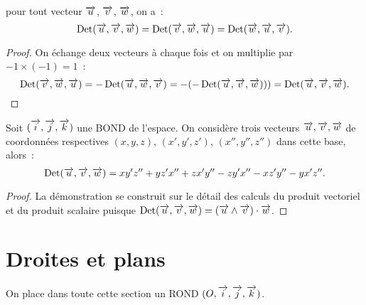 \begin{cor}
  pour tout vecteur \(\vu\), \(\vv\), \(\vw\), on a~:
  \begin{equation}
    \Det(\vu, \vv, \vw) = \Det(\vv, \vw, \vu) = \Det(\vw, \vu, \vv).
  \end{equation}
\end{cor}

\begin{proof}
  On échange deux vecteurs à chaque fois et on multiplie par \(-1\times(-1) =
  1\)~:
  \begin{equation}
    \Det(\vv, \vw, \vu) = -\Det(\vu, \vw, \vv) = -(-\Det(\vu, \vv, \vw))) =
    \Det(\vu, \vv, \vw).
  \end{equation}
\end{proof}

\begin{prop}
  Soit \(\bondtrois\) une BOND de l'espace. On considère trois vecteurs \(\vu,
  \vv, \vw\) de coordonnées respectives \((x, y, z)\), \((x', y', z')\),
  \((x'', y'', z'')\) dans cette base, alors~:
  \begin{equation}
    \Det(\vu, \vv, \vw) = xy'z'' + yz'x'' + zx'y'' - zy'x'' - xz'y'' - yx'z''.
  \end{equation}
\end{prop}

\begin{proof}
  La démonstration se construit sur le détail des calculs du produit vectoriel
  et du produit scalaire puisque \(\Det(\vu, \vv, \vw) =
  (\vu\wedge\vv)\cdot\vw\).
\end{proof}

\section{Droites et plans}
On place dans toute cette section un ROND \(\rondtrois\).

